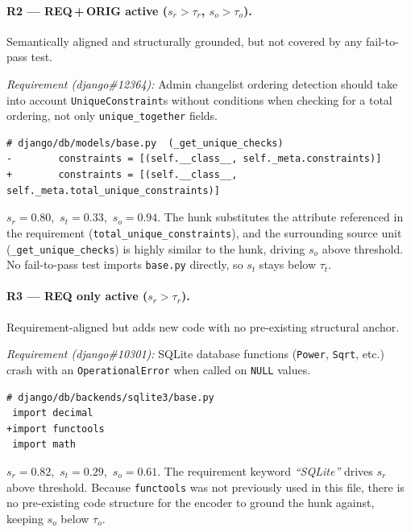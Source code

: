 \paragraph{R2 — REQ\,+\,ORIG active \textnormal{($s_r > \tau_r$, $s_o > \tau_o$)}.}
Semantically aligned and structurally grounded, but not covered by any fail-to-pass test.

\smallskip
\noindent\textit{Requirement (django\#12364):}
Admin changelist ordering detection should take into account \texttt{UniqueConstraint}s
without conditions when checking for a total ordering, not only \texttt{unique\_together}
fields.

\begin{lstlisting}
# django/db/models/base.py  (_get_unique_checks)
-        constraints = [(self.__class__, self._meta.constraints)]
+        constraints = [(self.__class__, self._meta.total_unique_constraints)]
\end{lstlisting}

\noindent$s_r{=}0.80$,\ $s_t{=}0.33$,\ $s_o{=}0.94$.
The hunk substitutes the attribute referenced in the requirement
(\texttt{total\_unique\_constraints}), and the surrounding source unit
(\texttt{\_get\_unique\_checks}) is highly similar to the hunk, driving $s_o$ above
threshold.  No fail-to-pass test imports \texttt{base.py} directly, so $s_t$ stays
below $\tau_t$.

\paragraph{R3 — REQ only active \textnormal{($s_r > \tau_r$)}.}
Requirement-aligned but adds new code with no pre-existing structural anchor.

\smallskip
\noindent\textit{Requirement (django\#10301):}
SQLite database functions (\texttt{Power}, \texttt{Sqrt}, etc.) crash with an
\texttt{OperationalError} when called on \texttt{NULL} values.

\begin{lstlisting}
# django/db/backends/sqlite3/base.py
 import decimal
+import functools
 import math
\end{lstlisting}

\noindent$s_r{=}0.82$,\ $s_t{=}0.29$,\ $s_o{=}0.61$.
The requirement keyword \textit{``SQLite''} drives $s_r$ above threshold.
Because \texttt{functools} was not previously used in this file, there is no
pre-existing code structure for the encoder to ground the hunk against, keeping
$s_o$ below $\tau_o$.

